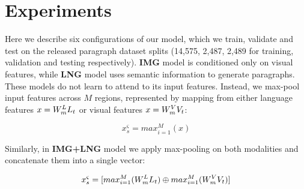 \documentclass[11pt,a4paper]{article}
\begin{document}

\section{Experiments}



Here we describe six configurations of our model, which we train, validate and test on the released paragraph dataset splits (14,575, 2,487, 2,489 for training, validation and testing respectively).
\textbf{IMG} model is conditioned only on visual features, while \textbf{LNG} model uses semantic information to generate paragraphs.
These models do not learn to attend to its input features.
Instead, we max-pool input features across $M$ regions, represented by mapping from either language features $x=W_{m}\sp{L} L_t$ or visual features $x=W_{m}\sp{V} V_t$:

\begin{equation}
    x^\varsigma_s =  max_{i=1}^M(x)
    \label{eqn:maxpool}
\end{equation}

Similarly, in \textbf{IMG+LNG} model we apply max-pooling on both modalities and concatenate them into a single vector:

\begin{equation}
    x^\varsigma_s = [max_{i=1}^M(W_{m}\sp{L} L_t) \oplus max_{i=1}^M(W_{m}\sp{V} V_t)]
    \label{eqn:maxpool}
\end{equation}
\end{document}
